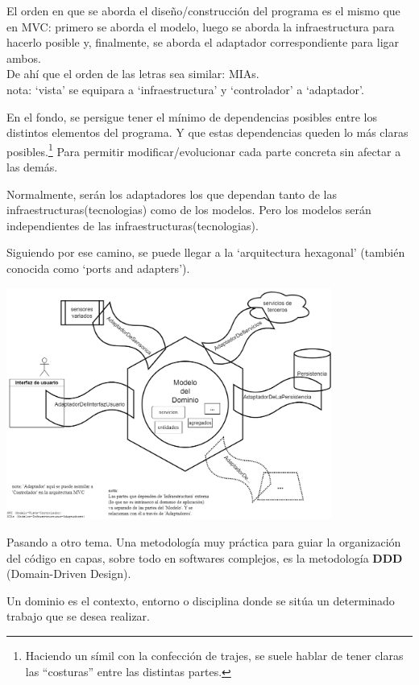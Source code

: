\documentclass[spanish,12pt,a4paper,final,oneside]{book}
\begin{document}
El orden en que se aborda el diseño/construcción del programa es el mismo que en MVC: primero se aborda el modelo, luego se aborda la infraestructura para hacerlo posible y, finalmente, se aborda el adaptador correspondiente para ligar ambos. 
\\De ahí que el orden de las letras sea similar: MIAs.
\\{\footnotesize nota: `vista' se equipara a `infraestructura' y `controlador' a `adaptador'.}

En el fondo, se persigue tener el mínimo de dependencias posibles entre los distintos elementos del programa. Y que estas dependencias queden lo más claras posibles.\footnote{Haciendo un símil con la confección de trajes, se suele hablar de tener claras las ``costuras'' entre las distintas partes.} Para permitir modificar/evolucionar cada parte concreta sin afectar a las demás.

Normalmente, serán los adaptadores los que dependan tanto de las infraestructuras(tecnologias) como de los modelos. Pero los modelos serán independientes de las infraestructuras(tecnologias). 

Siguiendo por ese camino, se puede llegar a la `arquitectura hexagonal' (también conocida como `ports and adapters').
\begin{center}\includegraphics[width=0.8\textwidth]{Arquitectura Hexagonal}\end{center}




Pasando a otro tema. Una metodología muy práctica para guiar la organización del código en capas, sobre todo en softwares complejos, es la metodología \textbf{DDD} (Domain-Driven Design).

Un dominio es el contexto, entorno o disciplina donde se sitúa un determinado trabajo que se desea realizar. 
\end{document}
